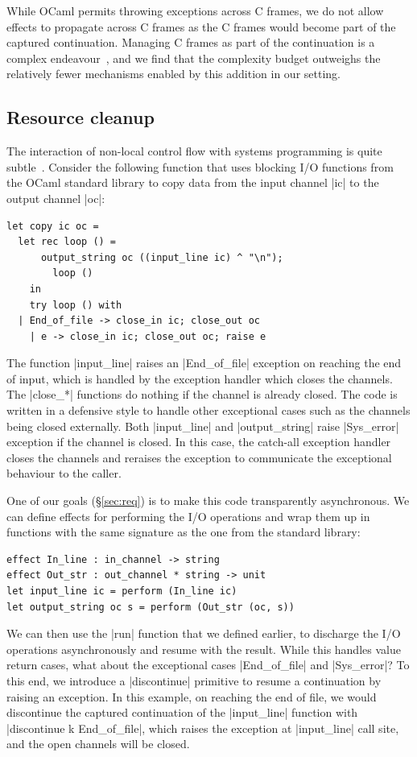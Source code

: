 \documentclass[sigplan,screen]{acmart}
\begin{document}
While OCaml permits throwing exceptions across C frames, we do not allow
effects to propagate across C frames as the C frames would become part of the
captured continuation. Managing C frames as part of the continuation is a
complex endeavour~\cite{Leijen17}, and we find that the complexity budget
outweighs the relatively fewer mechanisms enabled by this addition in our
setting.

\subsection{Resource cleanup}

The interaction of non-local control flow with systems programming is quite
subtle~\cite{TFP17, Leijen18}. Consider the following function that uses
blocking I/O functions from the OCaml standard library to copy data from the
input channel |ic| to the output channel |oc|:
\begin{lstlisting}
let copy ic oc =
  let rec loop () =
	  output_string oc ((input_line ic) ^ "\n");
		loop ()
	in
	try loop () with
  | End_of_file -> close_in ic; close_out oc
	| e -> close_in ic; close_out oc; raise e
\end{lstlisting}
The function |input_line| raises an |End_of_file| exception on reaching the end
of input, which is handled by the exception handler which closes the channels.
The |close_*| functions do nothing if the channel is already closed. The code
is written in a defensive style to handle other exceptional cases such as the
channels being closed externally. Both |input_line| and |output_string| raise
|Sys_error| exception if the channel is closed. In this case, the catch-all
exception handler closes the channels and reraises the exception to communicate
the exceptional behaviour to the caller.

One of our goals (\S\ref{sec:req}) is to make this code transparently
asynchronous. We can define effects for performing the I/O operations and wrap
them up in functions with the same signature as the one from the standard
library:
\begin{lstlisting}
effect In_line : in_channel -> string
effect Out_str : out_channel * string -> unit
let input_line ic = perform (In_line ic)
let output_string oc s = perform (Out_str (oc, s))
\end{lstlisting}

We can then use the |run| function that we defined earlier, to discharge the
I/O operations asynchronously and resume with the result. While this handles
value return cases, what about the exceptional cases |End_of_file| and
|Sys_error|? To this end, we introduce a |discontinue| primitive to resume a
continuation by raising an exception. In this example, on reaching the end of
file, we would discontinue the captured continuation of the |input_line|
function with |discontinue k End_of_file|, which raises the exception at
|input_line| call site, and the open channels will be closed.
\end{document}
